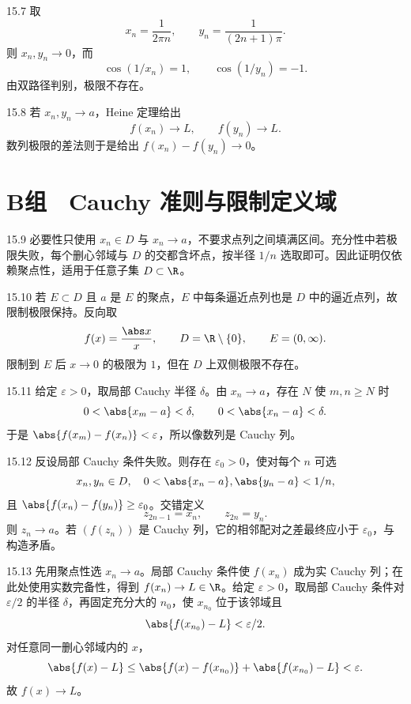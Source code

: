 \begin{solution}{15.7}
取
\[
 x_n=\frac1{2\pi n},\qquad y_n=\frac1{(2n+1)\pi}.
\]
则 \(x_n,y_n\to0\)，而
\[
 \cos(1/x_n)=1,\qquad \cos(1/y_n)=-1.
\]
由双路径判别，极限不存在。
\end{solution}

\begin{solution}{15.8}
若 \(x_n,y_n\to a\)，Heine 定理给出
\[
 f(x_n)\to L,\qquad f(y_n)\to L.
\]
数列极限的差法则于是给出 \(f(x_n)-f(y_n)\to0\)。
\end{solution}

\section*{B组　Cauchy 准则与限制定义域}

\begin{solution}{15.9}
必要性只使用 \(x_n\in D\) 与 \(x_n\to a\)，不要求点列之间填满区间。充分性中若极限失败，每个删心邻域与 \(D\) 的交都含坏点，按半径 \(1/n\) 选取即可。因此证明仅依赖聚点性，适用于任意子集 \(D\subset\R\)。
\end{solution}

\begin{solution}{15.10}
若 \(E\subset D\) 且 \(a\) 是 \(E\) 的聚点，\(E\) 中每条逼近点列也是 \(D\) 中的逼近点列，故限制极限保持。反向取
\[
 f(x)=\frac{\abs x}{x},\qquad D=\R\setminus\{0\},\qquad E=(0,\infty).
\]
限制到 \(E\) 后 \(x\to0\) 的极限为 \(1\)，但在 \(D\) 上双侧极限不存在。
\end{solution}

\begin{solution}{15.11}
给定 \(\varepsilon>0\)，取局部 Cauchy 半径 \(\delta\)。由 \(x_n\to a\)，存在 \(N\) 使 \(m,n\ge N\) 时
\[
 0<\abs{x_m-a}<\delta,\qquad0<\abs{x_n-a}<\delta.
\]
于是 \(\abs{f(x_m)-f(x_n)}<\varepsilon\)，所以像数列是 Cauchy 列。
\end{solution}

\begin{solution}{15.12}
反设局部 Cauchy 条件失败。则存在 \(\varepsilon_0>0\)，使对每个 \(n\) 可选
\[
 x_n,y_n\in D,\quad
 0<\abs{x_n-a},\abs{y_n-a}<1/n,
\]
且 \(\abs{f(x_n)-f(y_n)}\ge\varepsilon_0\)。交错定义
\[
 z_{2n-1}=x_n,\qquad z_{2n}=y_n.
\]
则 \(z_n\to a\)。若 \((f(z_n))\) 是 Cauchy 列，它的相邻配对之差最终应小于 \(\varepsilon_0\)，与构造矛盾。
\end{solution}

\begin{solution}{15.13}
先用聚点性选 \(x_n\to a\)。局部 Cauchy 条件使 \(f(x_n)\) 成为实 Cauchy 列；在此处使用实数完备性，得到 \(f(x_n)\to L\in\R\)。给定 \(\varepsilon>0\)，取局部 Cauchy 条件对 \(\varepsilon/2\) 的半径 \(\delta\)，再固定充分大的 \(n_0\)，使 \(x_{n_0}\) 位于该邻域且
\[
 \abs{f(x_{n_0})-L}<\varepsilon/2.
\]
对任意同一删心邻域内的 \(x\)，
\[
 \abs{f(x)-L}
 \le\abs{f(x)-f(x_{n_0})}+\abs{f(x_{n_0})-L}
 <\varepsilon.
\]
故 \(f(x)\to L\)。
\end{solution}

